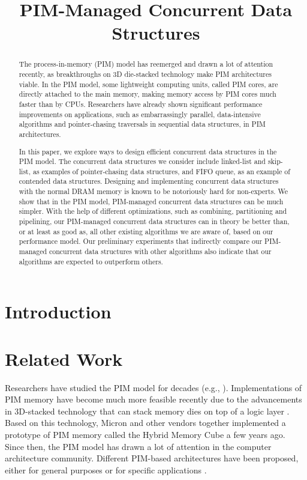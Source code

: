 \documentclass[11pt]{article}
\title{PIM-Managed Concurrent Data Structures}
\author{}
\date{}							%
\begin{document}
\maketitle

\begin{abstract}
The process-in-memory (PIM) model has reemerged and drawn a lot of attention recently, 
as breakthroughs on 3D die-stacked technology make PIM architectures viable. 
In the PIM model, some lightweight computing units, called PIM cores, are directly attached to 
the main memory, making memory access by PIM cores much faster than by CPUs. 
Researchers have already shown significant performance improvements on applications, 
such as embarrassingly parallel, data-intensive algorithms and 
pointer-chasing traversals in sequential data structures, in PIM architectures. 

In this paper, we explore ways to design efficient concurrent data structures in the PIM model. 
The concurrent data structures we consider include linked-list and skip-list, 
as examples of pointer-chasing data structures, 
and FIFO queue, as an example of contended data structures.  
Designing and implementing concurrent data structures with the normal DRAM memory 
is known to be notoriously hard for non-experts. 
We show that in the PIM model, PIM-managed concurrent data structures can be much simpler. 
With the help of different optimizations, such as combining, partitioning and pipelining, 
our PIM-managed concurrent data structures can in theory be better than, or at least as good as, 
all other existing algorithms we are aware of, based on our performance model. 
Our preliminary experiments that indirectly compare our PIM-managed concurrent data structures 
with other algorithms also indicate that our algorithms are expected to outperform others. 
\end{abstract}
\newpage

\section{Introduction}

\section{Related Work}
Researchers have studied the PIM model for decades (e.g., \cite{Stone1970, Kogge1994, 
Gokhale1995, Patterson1997, Oskin1998, KangHYKGLTP99, Hall1999}). 
Implementations of PIM memory have become much more feasible recently due to the advancements 
in 3D-stacked technology that can stack memory dies on top of a logic layer 
\cite{jeddeloh2012, Loh2008, Black2006}. 
Based on this technology, Micron and other vendors together implemented a prototype of 
PIM memory called the Hybrid Memory Cube \cite{website:HMC} a few years ago. 
Since then, the PIM model has drawn a lot of attention in the computer architecture community. 
Different PIM-based architectures have been proposed, either for general purposes or for 
specific applications \cite{Ahn2015:1, Ahn2015:2, Zhang2014:TTP, hsieh2016accelerating,
Azarkhish16, Akin2015:DRM, Azarkhish2015, AzarkhishPRLB17, boroumand2016, ZhuASSHPF13, ZhuGSPF13}.
\end{document}
